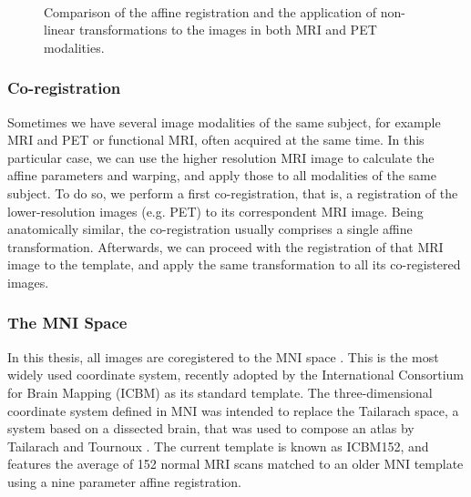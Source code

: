 \begin{figure}[bth]
	\myfloatalign
	 \\
	\caption[Comparison of the affine registration and the application of non-linear transformations to the images]{Comparison of the affine registration and the application of non-linear transformations to the images in both \ac{MRI} and \ac{PET} modalities.}\label{fig:diffeomorphisms}
\end{figure}


\subsubsection{Co-registration}
Sometimes we have several image modalities of the same subject, for example \ac{MRI} and \ac{PET} or functional \ac{MRI}, often acquired at the same time. In this particular case, we can use the higher resolution \ac{MRI} image to calculate the affine parameters and warping, and apply those to all modalities of the same subject. To do so, we perform a first co-registration, that is, a registration of the lower-resolution images (e.g. \ac{PET}) to its correspondent \ac{MRI} image. Being anatomically similar, the co-registration usually comprises a single affine transformation. Afterwards, we can proceed with the registration of that \ac{MRI} image to the template, and apply the same transformation to all its co-registered images. 

\subsubsection{The MNI Space}
In this thesis, all images are coregistered to the \acf{MNI} space \cite{Mazziotta2001}. This is the most widely used coordinate system, recently adopted by the International Consortium for Brain Mapping (ICBM) as its standard template. The three-dimensional coordinate system defined in \ac{MNI} was intended to replace the Tailarach space, a system based on a dissected brain, that was used to compose an atlas by Tailarach and Tournoux \cite{Talairach1988c}. The current template is known as ICBM152, and features the average of 152 normal \ac{MRI} scans matched to an older \ac{MNI} template using a nine parameter affine registration. 

